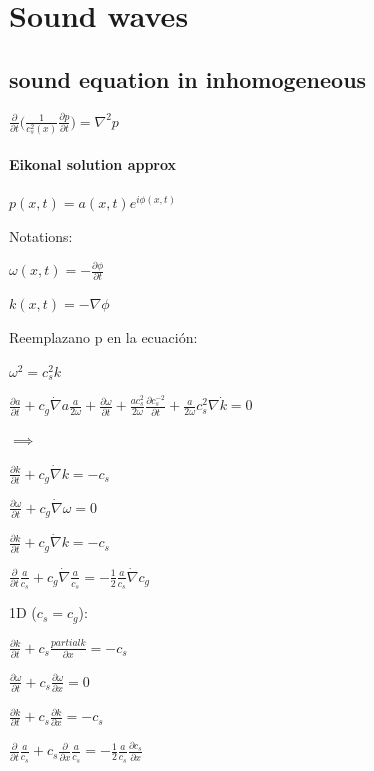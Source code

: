 \documentclass{article}
\begin{document}
\section{Sound waves}

\subsection{sound equation in inhomogeneous}

$\frac{\partial}{\partial t} \big(\frac{1}{c_s^{2}(x)} \frac{\partial p}{\partial t}\big) = \nabla^{2} p    $

\paragraph{Eikonal solution approx}


$p(x,t) = a(x,t) e^{i \phi(x,t)}$

Notations:

$\omega(x,t) = -\frac{\partial \phi}{\partial t}$

$k(x,t) = -\nabla \phi$


Reemplazano p en la ecuación:

$\omega^{2} = c_s^{2} k$


$\frac{\partial a}{\partial t} + c_g \dot \nabla a   \frac{a}{2 \omega} + \frac{\partial \omega}{\partial t} 
+ \frac{a c_s^{2}}{2 \omega} \frac{\partial c_s ^{-2}}{\partial t} + \frac{a}{2 \omega} c_s^2 \nabla \dot k = 0
$

$\implies $


$\frac{\partial k}{\partial t} + c_g \dot \nabla k = -c_s $

$\frac{\partial \omega}{\partial t} + c_g \dot \nabla \omega = 0 $

$\frac{\partial k}{\partial t} + c_g \dot \nabla k = -c_s $

$\frac{\partial}{\partial t} \frac{a}{c_s} + c_g \dot \nabla \frac{a}{c_s} = -\frac{1}{2} \frac{a}{c_s} \dot \nabla c_g$


1D ($c_s = c_g$):

$\frac{\partial k}{\partial t} + c_s \frac{partial k}{\partial x} = -c_s $

$\frac{\partial \omega}{\partial t} + c_s \frac{\partial \omega}{\partial x} = 0 $

$\frac{\partial k}{\partial t} + c_s \frac{\partial k}{\partial x} = -c_s $

$\frac{\partial}{\partial t} \frac{a}{c_s} + c_s \frac{\partial}{\partial x} \frac{a}{c_s} = -\frac{1}{2} \frac{a}{c_s} \frac{\partial c_s}{\partial x}$
\end{document}
